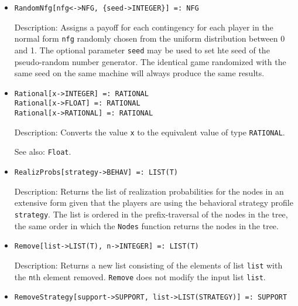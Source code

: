 \begin{itemize}
\item
\protect \large \begin{verbatim}
RandomNfg[nfg<->NFG, {seed->INTEGER}] =: NFG
\end{verbatim}\normalsize

\bd
\item
[Description:] Assigns a payoff for each contingency for each player in
the normal form \verb+nfg+ randomly chosen from the uniform distribution
between 0 and 1.  The optional parameter \verb+seed+ may be used to
set hte seed of the pseudo-random number generator.  The identical game
randomized with the same seed on the same machine will always produce
the same results.
\ed

\item
\protect \large \begin{verbatim}
Rational[x->INTEGER] =: RATIONAL
Rational[x->FLOAT] =: RATIONAL
Rational[x->RATIONAL] =: RATIONAL
\end{verbatim} \normalsize

\bd
\item
[Description:] Converts the value \verb+x+ to the equivalent value of
type {\tt RATIONAL}.
\item
[See also:] {\tt Float}.
\ed

\item
\protect \large \begin{verbatim}
RealizProbs[strategy->BEHAV] =: LIST(T)
\end{verbatim}\normalsize

\bd
\item
[Description:] Returns the list of realization probabilities for the
nodes in an extensive form given that the players are using the behavioral
strategy profile \verb+strategy+.  The list is ordered in the prefix-traversal
of the nodes in the tree, the same order in which the {\tt Nodes} function
returns the nodes in the tree.
\ed

\item
\protect \large \begin{verbatim}
Remove[list->LIST(T), n->INTEGER] =: LIST(T)
\end{verbatim}\normalsize

\bd
\item
[Description:] Returns a new list consisting of the elements of list
\verb+list+ with the \verb+n+th element removed.  {\tt Remove} does not
modify the input list \verb+list+.
\ed

\item
\protect \large \begin{verbatim}
RemoveStrategy[support->SUPPORT, list->LIST(STRATEGY)] =: SUPPORT
\end{verbatim}\normalsize


\end{itemize}
